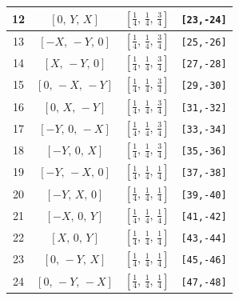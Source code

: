 \documentclass[fleqn,8pt]{jsarticle}
\begin{document}
\begin{longtable}{cccc}
12 & $\left[ 0,\, Y,\, X \right]$ & $\left[ \frac{1}{4},\, \frac{1}{4},\, \frac{3}{4} \right]$ & {\tt [23,-24]} \\ \hline
13 & $\left[ - X,\, - Y,\, 0 \right]$ & $\left[ \frac{1}{4},\, \frac{1}{4},\, \frac{3}{4} \right]$ & {\tt [25,-26]} \\ \hline
14 & $\left[ X,\, - Y,\, 0 \right]$ & $\left[ \frac{1}{4},\, \frac{1}{4},\, \frac{3}{4} \right]$ & {\tt [27,-28]} \\ \hline
15 & $\left[ 0,\, - X,\, - Y \right]$ & $\left[ \frac{1}{4},\, \frac{1}{4},\, \frac{3}{4} \right]$ & {\tt [29,-30]} \\ \hline
16 & $\left[ 0,\, X,\, - Y \right]$ & $\left[ \frac{1}{4},\, \frac{1}{4},\, \frac{3}{4} \right]$ & {\tt [31,-32]} \\ \hline
17 & $\left[ - Y,\, 0,\, - X \right]$ & $\left[ \frac{1}{4},\, \frac{1}{4},\, \frac{3}{4} \right]$ & {\tt [33,-34]} \\ \hline
18 & $\left[ - Y,\, 0,\, X \right]$ & $\left[ \frac{1}{4},\, \frac{1}{4},\, \frac{3}{4} \right]$ & {\tt [35,-36]} \\ \hline
19 & $\left[ - Y,\, - X,\, 0 \right]$ & $\left[ \frac{1}{4},\, \frac{1}{4},\, \frac{1}{4} \right]$ & {\tt [37,-38]} \\ \hline
20 & $\left[ - Y,\, X,\, 0 \right]$ & $\left[ \frac{1}{4},\, \frac{1}{4},\, \frac{1}{4} \right]$ & {\tt [39,-40]} \\ \hline
21 & $\left[ - X,\, 0,\, Y \right]$ & $\left[ \frac{1}{4},\, \frac{1}{4},\, \frac{1}{4} \right]$ & {\tt [41,-42]} \\ \hline
22 & $\left[ X,\, 0,\, Y \right]$ & $\left[ \frac{1}{4},\, \frac{1}{4},\, \frac{1}{4} \right]$ & {\tt [43,-44]} \\ \hline
23 & $\left[ 0,\, - Y,\, X \right]$ & $\left[ \frac{1}{4},\, \frac{1}{4},\, \frac{1}{4} \right]$ & {\tt [45,-46]} \\ \hline
24 & $\left[ 0,\, - Y,\, - X \right]$ & $\left[ \frac{1}{4},\, \frac{1}{4},\, \frac{1}{4} \right]$ & {\tt [47,-48]} \\
\end{longtable}
\renewcommand{\arraystretch}{1.2}
\end{document}
